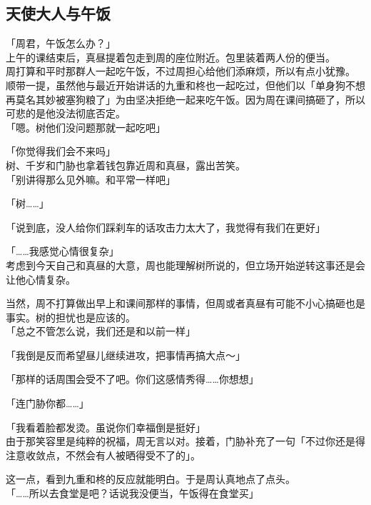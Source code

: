 \subsection{天使大人与午饭}

「周君，午饭怎么办？」\\

上午的课结束后，真昼提着包走到周的座位附近。包里装着两人份的便当。\\

周打算和平时那群人一起吃午饭，不过周担心给他们添麻烦，所以有点小犹豫。\\

顺带一提，虽然他与最近开始讲话的九重和柊也一起吃过，但他们以「单身狗不想再莫名其妙被塞狗粮了」为由坚决拒绝一起来吃午饭。因为周在课间搞砸了，所以可悲的是他没法彻底否定。\\

「嗯。树他们没问题那就一起吃吧」

「你觉得我们会不来吗」\\

树、千岁和门胁也拿着钱包靠近周和真昼，露出苦笑。\\

「别讲得那么见外嘛。和平常一样吧」

「树……」

「说到底，没人给你们踩刹车的话攻击力太大了，我觉得有我们在更好」

「……我感觉心情很复杂」\\

考虑到今天自己和真昼的大意，周也能理解树所说的，但立场开始逆转这事还是会让他心情复杂。

当然，周不打算做出早上和课间那样的事情，但周或者真昼有可能不小心搞砸也是事实。树的担忧也是应该的。\\

「总之不管怎么说，我们还是和以前一样」

「我倒是反而希望昼儿继续进攻，把事情再搞大点～」

「那样的话周围会受不了吧。你们这感情秀得……你想想」

「连门胁你都……」

「我看着脸都发烫。虽说你们幸福倒是挺好」\\

由于那笑容里是纯粹的祝福，周无言以对。接着，门胁补充了一句「不过你还是得注意收敛点，不然会有人被晒得受不了的」。

这一点，看到九重和柊的反应就能明白。于是周认真地点了点头。\\

「……所以去食堂是吧？话说我没便当，午饭得在食堂买」

